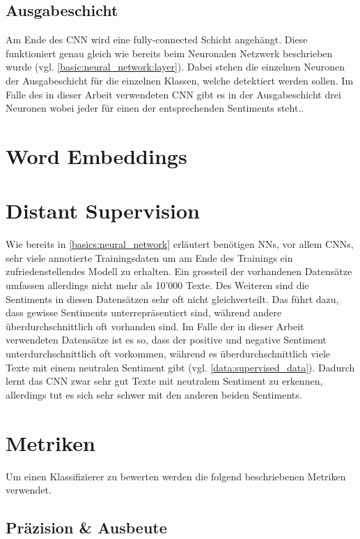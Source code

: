 \subsection{Ausgabeschicht}
Am Ende des CNN wird eine fully-connected Schicht angehängt. Diese funktioniert genau gleich wie bereits beim Neuronalen Netzwerk beschrieben wurde (vgl. \ref{basic:neural_network:layer}). Dabei stehen die einzelnen Neuronen der Ausgabeschicht für die einzelnen Klassen, welche detektiert werden sollen. Im Falle des in dieser Arbeit verwendeten CNN gibt es in der Ausgabeschicht drei Neuronen wobei jeder für einen der entsprechenden Sentiments steht..
\section{Word Embeddings}

\section{Distant Supervision}
Wie bereits in \ref{basics:neural_network} erläutert benötigen NNs, vor allem CNNs, sehr viele annotierte Trainingsdaten  um am Ende des Trainings ein zufriedenstellendes Modell zu erhalten. Ein grossteil der vorhandenen Datensätze umfassen allerdings nicht mehr als 10'000 Texte. Des Weiteren sind die Sentiments in diesen Datensätzen sehr oft nicht gleichverteilt. Das führt dazu, dass gewisse Sentiments unterrepräsentiert sind, während andere überdurchschnittlich oft vorhanden sind. Im Falle der in dieser Arbeit verwendeten Datensätze ist es so, dass der positive und negative Sentiment unterdurchschnittlich oft vorkommen, während es überdurchschnittlich viele Texte mit einem neutralen Sentiment gibt (vgl. \ref{data:supervised_data}). Dadurch lernt das CNN zwar sehr gut Texte mit neutralem Sentiment zu erkennen, allerdings tut es sich sehr schwer mit den anderen beiden Sentiments.
\section{Metriken}
Um einen Klassifizierer zu bewerten werden die folgend beschriebenen Metriken verwendet.
\subsection{Präzision {\&} Ausbeute}
\label{basics:metrics:precision_recall}

